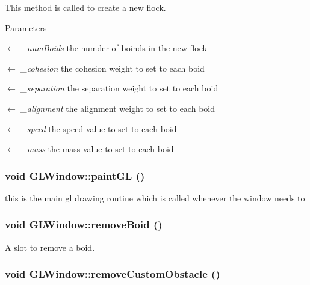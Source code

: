 This method is called to create a new flock. 
\begin{DoxyParams}{Parameters}
\item[\mbox{$\leftarrow$} {\em \_\-numBoids}]the numder of boinds in the new flock \item[\mbox{$\leftarrow$} {\em \_\-cohesion}]the cohesion weight to set to each boid \item[\mbox{$\leftarrow$} {\em \_\-separation}]the separation weight to set to each boid \item[\mbox{$\leftarrow$} {\em \_\-alignment}]the alignment weight to set to each boid \item[\mbox{$\leftarrow$} {\em \_\-speed}]the speed value to set to each boid \item[\mbox{$\leftarrow$} {\em \_\-mass}]the mass value to set to each boid \end{DoxyParams}
\hypertarget{classGLWindow_a9bd2503dd5f812c10a9481f22ecd3403}{
\subsubsection[{paintGL}]{\setlength{\rightskip}{0pt plus 5cm}void GLWindow::paintGL ()}}
\label{classGLWindow_a9bd2503dd5f812c10a9481f22ecd3403}


this is the main gl drawing routine which is called whenever the window needs to \hypertarget{classGLWindow_a092b2f8ed729523621fa725c77ce7ac7}{
\subsubsection[{removeBoid}]{\setlength{\rightskip}{0pt plus 5cm}void GLWindow::removeBoid ()}}
\label{classGLWindow_a092b2f8ed729523621fa725c77ce7ac7}


A slot to remove a boid. \hypertarget{classGLWindow_a8501a6203119572cbdfcb11c1c9098ab}{
\subsubsection[{removeCustomObstacle}]{\setlength{\rightskip}{0pt plus 5cm}void GLWindow::removeCustomObstacle ()}}
\label{classGLWindow_a8501a6203119572cbdfcb11c1c9098ab}


